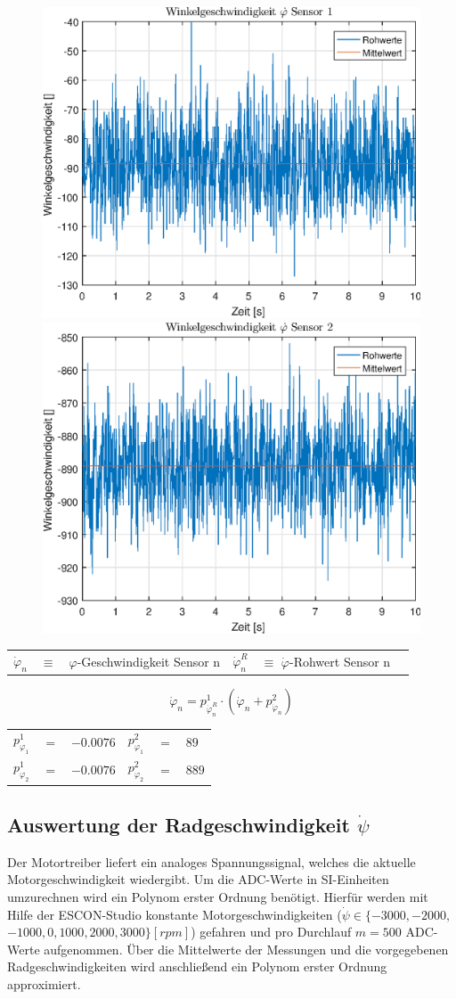 \begin{figure}[h]
	\includegraphics[width=0.5\linewidth]{img/phi1__d.eps}
	\includegraphics[width=0.5\linewidth]{img/phi2__d.eps}
\end{figure}

\begin{table}[h]
\centering
\begin{tabular}{lcllcl}
$\dot{\varphi}_n$ & $\equiv$ & $\varphi$-Geschwindigkeit Sensor n & $\dot{\varphi}^R_n$ & $\equiv$ $\dot{\varphi}$-Rohwert Sensor n
\end{tabular}
\end{table}

\begin{equation}
\dot{\varphi}_n = p^1_{\dot{\varphi}^R_n}  \cdot (\dot{\varphi}_n + p^2_{\dot{\varphi}_n})
\end{equation}

\begin{table}[h]
\centering
\begin{tabular}{lcllcl}
$p^1_{\varphi_1}$ &$=$& $-0.0076$ & $p^2_{\varphi_1}$ &$=$& $89$ \\
$p^1_{\varphi_2}$ &$=$& $-0.0076$ & $p^2_{\varphi_2}$ &$=$& $889$ \\
\end{tabular}
\end{table}

\subsection{Auswertung der Radgeschwindigkeit $\dot{\psi}$}
Der Motortreiber liefert ein analoges Spannungssignal, welches die aktuelle Motorgeschwindigkeit wiedergibt. Um die ADC-Werte in SI-Einheiten umzurechnen wird ein Polynom erster Ordnung benötigt. Hierfür werden mit Hilfe der ESCON-Studio konstante Motorgeschwindigkeiten ($\dot{\psi} \in \{ -3000, -2000,$  $-1000, 0, 1000, 2000, 3000 \} [rpm] $) gefahren und pro Durchlauf $m=500$ ADC-Werte aufgenommen. Über die Mittelwerte der Messungen und die vorgegebenen Radgeschwindigkeiten wird anschließend ein Polynom erster Ordnung approximiert.

